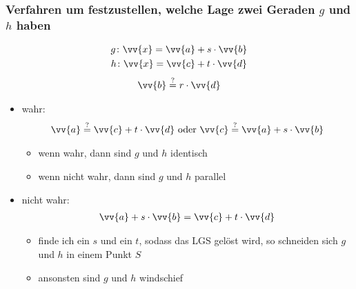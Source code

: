 \subsubsection{Verfahren um festzustellen, welche Lage zwei Geraden $g$ und $h$ haben}
\begin{gather*}
  g \colon \vv{x} = \vv{a} + s \cdot \vv{b} \\
  h \colon \vv{x} = \vv{c} + t \cdot \vv{d}
\end{gather*}
\begin{gather*}
  \vv{b} \stackrel{?}{=} r \cdot \vv{d}
\end{gather*}
\begin{itemize}
  \item wahr:
  \begin{gather*}
    \vv{a} \stackrel{?}{=} \vv{c} + t \cdot \vv{d} \text{ oder } \vv{c} \stackrel{?}{=} \vv{a} + s \cdot \vv{b}
  \end{gather*}
  \begin{itemize}
    \item wenn wahr, dann sind $g$ und $h$ identisch
    \item wenn nicht wahr, dann sind $g$ und $h$ parallel
  \end{itemize}
  \newpage
  \item nicht wahr:
  \begin{gather*}
    \vv{a} + s \cdot \vv{b} = \vv{c} + t \cdot \vv{d}
  \end{gather*}
  \begin{itemize}
    \item finde ich ein $s$ und ein $t$, sodass das LGS gelöst wird, so schneiden sich $g$ und $h$ in einem Punkt $S$
    \item ansonsten sind $g$ und $h$ windschief
  \end{itemize}
\end{itemize}
